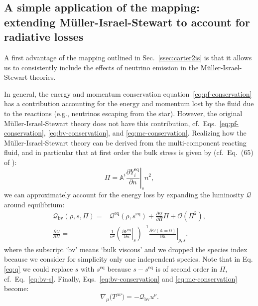 \documentclass[aps,prd,twocolumn,a4paper,floatfix,nofootbib,superscriptaddress,nofootinbib]{revtex4}
\newcommand{\req}{\mathrm{eq}}
\begin{document}
\subsection{A simple application of the mapping: extending M\"uller-Israel-Stewart to account for radiative losses}
\label{ssec:q}

A first advantage of the mapping outlined in Sec.~\ref{ssec:carter2is} is that it
allows us to consistently include the effects of neutrino emission in the
M\"uller-Israel-Stewart theories.

In general, the energy and momentum conservation equation~\eqref{eq:pf-conservation} 
has a contribution accounting for the energy
and momentum lost by the fluid due to the reactions (e.g., neutrinos escaping
from the star).  However, the original M\"uller-Israel-Stewart theory does not have this
contribution, cf.~Eqs.~\eqref{eq:pf-conservation},
\eqref{eq:bv-conservation}, and \eqref{eq:mc-conservation}.  Realizing how the
M\"uller-Israel-Stewart theory can be derived from the multi-component reacting fluid,
and in particular that at first order the bulk stress is given by
(cf.~Eq.~(65) of \citet{Gavassino21bulk}):
%
\begin{equation}
\label{eq:a2pi}
\Pi=\mathbb A^i\left.\frac{\partial Y_i^\req}{\partial n}\right|_{s}n^2,
\end{equation}
we can approximately account for the energy loss by expanding the luminosity $\mathcal Q$
around equilibrium:
%
\begin{align}
\label{eq:q}
\mathcal Q_\mathrm{bv}(\rho,s,\Pi)={}&\mathcal Q^\req(\rho,s^\req)
+\frac{\partial \mathcal Q}{\partial \Pi}\Pi + \mathcal O(\Pi^2),\\
\label{eq:dqdpi}
\frac{\partial \mathcal Q}{\partial \Pi}={}&
\frac1{n^2}\left(\left.\frac{\partial Y^\req}{\partial n}\right|_s\right)^{-1}
\left.\frac{\partial \mathcal Q(\mathbb A=0)}{\partial \mathbb A}\right|_{\rho,s}.
\end{align}
%
where the subscript `bv' means `bulk viscous' and we dropped the species index because we consider for simplicity
only one independent species. Note that in Eq. \eqref{eq:q} we could replace
$s$ with $s^\req$ because $s-s^\req$ is of second order in $\Pi$,
cf.~Eq.~\eqref{eq:bv-s}.  Finally, Eqs.~\eqref{eq:bv-conservation} and
\eqref{eq:mc-conservation} become:
%
\begin{equation}
\label{eq:conservation-q}
\nabla_\mu\big( T^{\mu \nu}\big)=-\mathcal Q_\mathrm{bv} u^\nu.
\end{equation}
\end{document}
